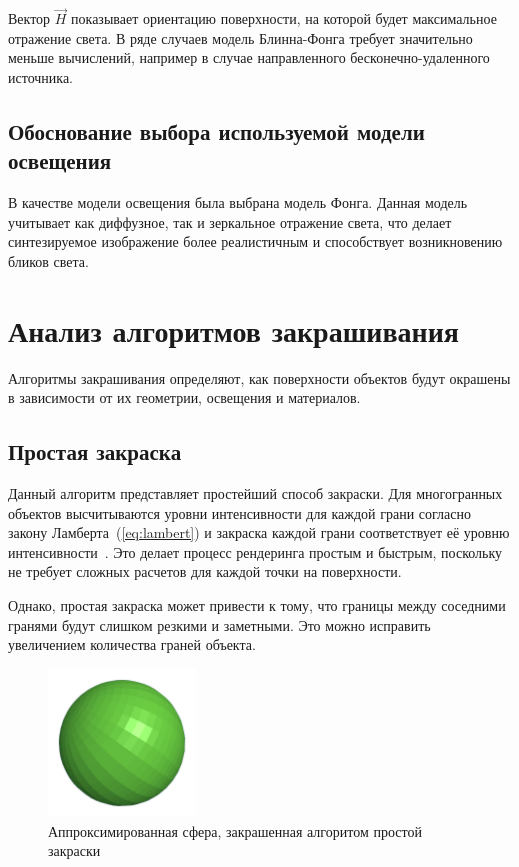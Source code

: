 Вектор $\vec{H}$ показывает ориентацию поверхности, на которой будет максимальное отражение света. В ряде случаев модель Блинна-Фонга требует значительно меньше вычислений, например в случае направленного бесконечно-удаленного источника.

\subsection{Обоснование выбора используемой модели освещения}

В качестве модели освещения была выбрана модель Фонга. Данная модель учитывает как диффузное, так и зеркальное отражение света, что делает синтезируемое изображение более реалистичным и способствует возникновению бликов света.

\section{Анализ алгоритмов закрашивания}

Алгоритмы закрашивания определяют, как поверхности объектов будут окрашены в зависимости от их геометрии, освещения и материалов.

\subsection{Простая закраска}

Данный алгоритм представляет простейший способ закраски. Для многогранных объектов высчитываются уровни интенсивности для каждой грани согласно закону Ламберта~(\ref{eq:lambert}) и закраска каждой грани соответствует её уровню интенсивности~\cite{lit3}. Это делает процесс рендеринга простым и быстрым, поскольку не требует сложных расчетов для каждой точки на поверхности.

Однако, простая закраска может привести к тому, что границы между соседними гранями будут слишком резкими и заметными. Это можно исправить увеличением количества граней объекта. 

\clearpage

\begin{figure}[h] 
	\centering
	\includegraphics[width=0.35\textwidth]{images/simple-shading.png}
	\caption{Аппроксимированная сфера, закрашенная алгоритом простой закраски} 
	\label{fig:simple-shading} 
\end{figure}

